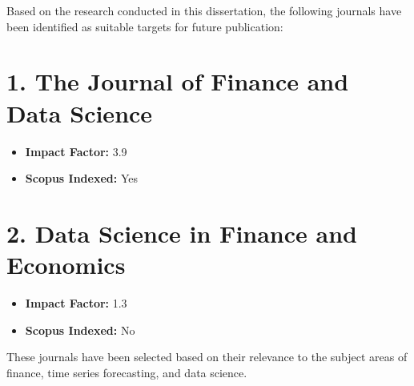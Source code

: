 Based on the research conducted in this dissertation, the following journals have been identified as suitable targets for future publication:

\section*{1. The Journal of Finance and Data Science}

\begin{itemize}
    \item \textbf{Impact Factor:} 3.9
    \item \textbf{Scopus Indexed:} Yes
\end{itemize}

\section*{2. Data Science in Finance and Economics}

\begin{itemize}
    \item \textbf{Impact Factor:} 1.3
    \item \textbf{Scopus Indexed:} No
\end{itemize}

These journals have been selected based on their relevance to the subject areas of finance, time series forecasting, and data science.